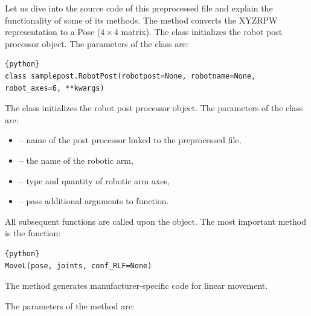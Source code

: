 

Let us dive into the source code of this preprocessed file and explain the functionality of some of its methods. The  method converts the XYZRPW representation to a Pose ($ 4 \times 4 $ matrix). The  class initializes the robot post processor object. The parameters of the  class are:


\begin{lstlisting}[frame=lines,numbers=none,breaklines=true]{python}
class samplepost.RobotPost(robotpost=None, robotname=None, robot_axes=6, **kwargs)
\end{lstlisting}

The  class initializes the robot post processor object. 
The parameters of the  class are:

\begin{itemize}

\item {} -- name of the post processor linked to the preprocessed file,

\item {} -- the name of the robotic arm,

\item {} -- type and quantity of robotic arm axes,

\item {} -- pass additional arguments to function.

\end{itemize}




All subsequent functions are called upon the  object. The most important method is the  function:


\begin{lstlisting}[frame=lines,numbers=none,breaklines=true]{python}
MoveL(pose, joints, conf_RLF=None)
\end{lstlisting}

The  method generates manufacturer-specific code for linear movement. 


The parameters of the  method are:

